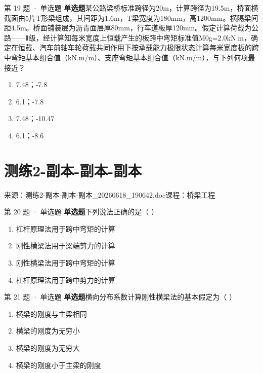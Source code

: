 \documentclass[UTF8,zihao=-4,openany]{ctexbook}
\newenvironment{choices}{\begin{enumerate}[label=\Alph*.,leftmargin=9mm,labelsep=3mm,itemsep=2pt,topsep=4pt]}{\end{enumerate}}
\newcommand{\qtype}[1]{\textcolor{brand}{\sffamily\bfseries #1}}
\newcommand{\sourcefile}[1]{\textcolor{muted}{\small\sffamily 来源：#1}}
\begin{document}
\begin{questionbox}{第 19 题 · 单选题}
\qtype{单选题}\quad 某公路梁桥标准跨径为20m，计算跨径为19.5m，桥面横截面由5片T形梁组成，其间距为1.6m，T梁宽度为180mm，高1200mm。横隔梁间距4.5m。桥面铺装层为沥青面层厚80mm，行车道板厚120mm。假定计算荷载为公路——Ⅱ级，经计算知每米宽度上恒载产生的板跨中弯矩标准值M0g=2.0kN.m，确定在恒载、汽车前轴车轮荷载共同作用下按承载能力极限状态计算每米宽度板的跨中弯矩基本组合值（kN.m/m）、支座弯矩基本组合值（kN.m/m），与下列何项最接近？
\begin{choices}
\item 7.48；-7.8
\item 6.1；-7.8
\item 7.48；-10.47
\item 6.1；-8.6
\end{choices}
\end{questionbox}

\chapter{测练2-副本-副本-副本}

\sourcefile{测练2-副本-副本-副本\_20260618\_190642.doc}\quad \textcolor{muted}{\small\sffamily 课程：桥梁工程}

\begin{questionbox}{第 20 题 · 单选题}
\qtype{单选题}\quad 下列说法正确的是（ ）
\begin{choices}
\item 杠杆原理法用于跨中弯矩的计算
\item 刚性横梁法用于梁端剪力的计算
\item 刚性横梁法用于跨中弯矩的计算
\item 杠杆原理法用于跨中剪力的计算
\end{choices}
\end{questionbox}

\begin{questionbox}{第 21 题 · 单选题}
\qtype{单选题}\quad 横向分布系数计算刚性横梁法的基本假定为（ ）
\begin{choices}
\item 横梁的刚度与主梁相同
\item 横梁的刚度为无穷小
\item 横梁的刚度为无穷大
\item 横梁的刚度小于主梁的刚度
\end{choices}
\end{questionbox}
\end{document}
